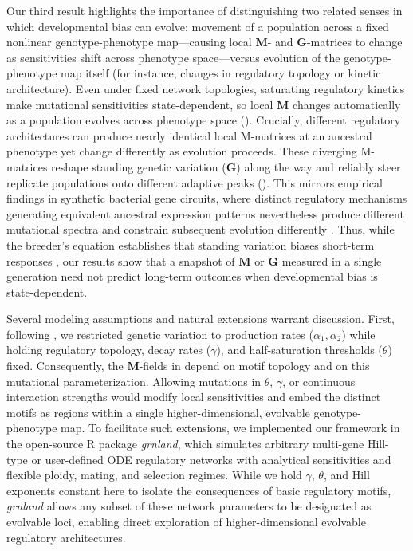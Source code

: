 Our third result highlights the importance of distinguishing two related senses in which developmental bias can evolve: movement of a population across a fixed nonlinear genotype-phenotype map—causing local $\mathbf{M}$- and $\mathbf{G}$-matrices to change as sensitivities shift across phenotype space—versus evolution of the genotype-phenotype map itself (for instance, changes in regulatory topology or kinetic architecture).
Even under fixed network topologies, saturating regulatory kinetics make mutational sensitivities state-dependent, so local $\mathbf{M}$ changes automatically as a population evolves across phenotype space ().
Crucially, different regulatory architectures can produce nearly identical local M-matrices at an ancestral phenotype yet change differently as evolution proceeds.
These diverging M-matrices reshape standing genetic variation ($\mathbf{G}$) along the way and reliably steer replicate populations onto different adaptive peaks ().
This mirrors empirical findings in synthetic bacterial gene circuits, where distinct regulatory mechanisms generating equivalent ancestral expression patterns nevertheless produce different mutational spectra and constrain subsequent evolution differently \parencite{schaerli2018synthetic}.
Thus, while the breeder's equation establishes that standing variation biases short-term responses \parencite{lande1979quantitative}, our results show that a snapshot of $\mathbf{M}$ or $\mathbf{G}$ measured in a single generation need not predict long-term outcomes when developmental bias is state-dependent.

Several modeling assumptions and natural extensions warrant discussion.
First, following \cite{hether2014genetic}, we restricted genetic variation to production rates ($\alpha_1, \alpha_2$) while holding regulatory topology, decay rates ($\gamma$), and half-saturation thresholds ($\theta$) fixed.
Consequently, the $\mathbf{M}$-fields in  depend on motif topology and on this mutational parameterization.
Allowing mutations in $\theta$, $\gamma$, or continuous interaction strengths would modify local sensitivities and embed the distinct motifs as regions within a single higher-dimensional, evolvable genotype-phenotype map.
To facilitate such extensions, we implemented our framework in the open-source R package \textit{grnland}, which simulates arbitrary multi-gene Hill-type or user-defined ODE regulatory networks with analytical sensitivities and flexible ploidy, mating, and selection regimes.
While we hold $\gamma$, $\theta$, and Hill exponents constant here to isolate the consequences of basic regulatory motifs, \textit{grnland} allows any subset of these network parameters to be designated as evolvable loci, enabling direct exploration of higher-dimensional evolvable regulatory architectures.

